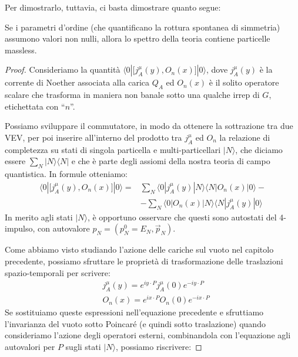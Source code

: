 \documentclass[../main.tex]{subfiles}
\begin{document}
Per dimostrarlo, tuttavia, ci basta dimostrare quanto segue:

\begin{theorem}
    Se i parametri d'ordine (che quantificano la rottura spontanea di simmetria) assumono valori non nulli, allora lo spettro della teoria contiene particelle massless.
    \label{th:goldstone_theorem_partial}
\end{theorem}
\begin{proof}
    Consideriamo la quantità $\langle 0|\big[j^\mu_A(y), O_n(x)\big]|0\rangle $, dove $j^\mu_A(y)$ è la corrente di Noether associata alla carica $Q_A$ ed $O_n(x)$ è il solito operatore scalare che trasforma in maniera non banale sotto una qualche irrep di $G$, etichettata con “$n$”.

    Possiamo sviluppare il commutatore, in modo da ottenere la sottrazione tra due VEV, per poi inserire all'interno del prodotto tra $j^\mu_A$ ed $O_n$ la relazione di completezza su stati di singola particella e multi-particellari $|N\rangle$, che diciamo essere $\sum_N|N\rangle\langle N|$ e che è parte degli assiomi della nostra teoria di campo quantistica. In formule otteniamo:
    \begin{align*}
        \langle 0|\big[j^\mu_A(y), O_n(x)\big]|0\rangle = &\sum_N\langle 0|j^\mu_A(y) |N\rangle\langle N| O_n(x)|0\rangle -\\
        &-  \sum_N\langle 0| O_n(x) |N\rangle\langle N| j^\mu_A(y) |0\rangle
    \end{align*}
    In merito agli stati $|N\rangle$, è opportuno osservare che questi sono autostati del 4-impulso, con autovalore $p_N = (p^0_N = E_N, \Vec{p}_N)$.

    Come abbiamo visto studiando l'azione delle cariche sul vuoto nel capitolo precedente, possiamo sfruttare le proprietà di trasformazione delle traslazioni spazio-temporali per scrivere:
    \begin{align*}
        &j^\mu_A(y) = e^{iy\cdot P}j^\mu_A(0)e^{-iy\cdot P}\\
        &O_n(x) = e^{ix\cdot P}O_n(0)e^{-ix\cdot P}
    \end{align*}
    Se sostituiamo queste espressioni nell'equazione precedente e sfruttiamo l'invarianza del vuoto sotto Poincaré (e quindi sotto traslazione) quando consideriamo l'azione degli operatori esterni, combinandola con l'equazione agli autovalori per $P$ sugli stati $|N\rangle$, possiamo riscrivere:
    

\end{proof}
\end{document}

